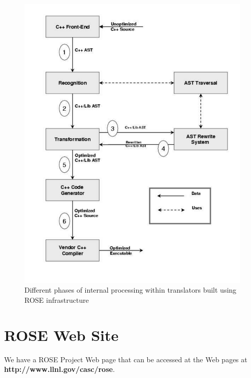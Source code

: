 \begin{figure}

\includegraphics[trim=6.0in 0in 0in 0in,scale=0.5]{rose-processing-phases}
\caption{Different phases of internal processing within translators built using ROSE infrastructure}
\label{introduction:phases}
\end{figure}



\section{ROSE Web Site}
    We have a ROSE Project Web page that can be accessed at the 
Web pages at
{\bf http://www.llnl.gov/casc/rose}.

